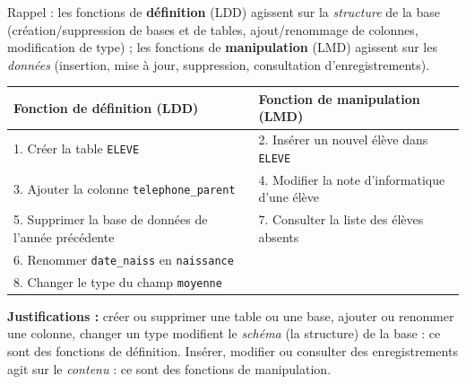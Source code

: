 \documentclass[11pt]{article}
\begin{document}
\begin{corrige}
Rappel : les fonctions de \textbf{définition} (LDD) agissent sur la \emph{structure} de la base (création/suppression de bases et de tables, ajout/renommage de colonnes, modification de type) ; les fonctions de \textbf{manipulation} (LMD) agissent sur les \emph{données} (insertion, mise à jour, suppression, consultation d'enregistrements).

\begin{center}
\begin{tabularx}{\linewidth}{|X|X|}
\hline
\rowcolor{popblueL} \textbf{Fonction de définition (LDD)} & \textbf{Fonction de manipulation (LMD)} \\
\hline
1. Créer la table \texttt{ELEVE} & 2. Insérer un nouvel élève dans \texttt{ELEVE} \\
\hline
3. Ajouter la colonne \texttt{telephone\_parent} & 4. Modifier la note d'informatique d'une élève \\
\hline
5. Supprimer la base de données de l'année précédente & 7. Consulter la liste des élèves absents \\
\hline
6. Renommer \texttt{date\_naiss} en \texttt{naissance} & \\
\hline
8. Changer le type du champ \texttt{moyenne} & \\
\hline
\end{tabularx}
\end{center}

\textbf{Justifications :} créer ou supprimer une table ou une base, ajouter ou renommer une colonne, changer un type modifient le \emph{schéma} (la structure) de la base : ce sont des fonctions de définition. Insérer, modifier ou consulter des enregistrements agit sur le \emph{contenu} : ce sont des fonctions de manipulation.
\end{corrige}
\end{document}
